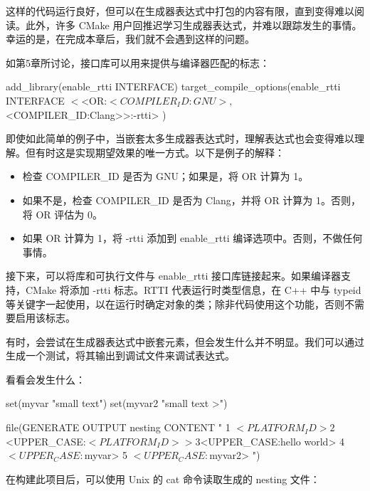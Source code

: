 这样的代码运行良好，但可以在生成器表达式中打包的内容有限，直到变得难以阅读。此外，许多 CMake 用户回推迟学习生成器表达式，并难以跟踪发生的事情。幸运的是，在完成本章后，我们就不会遇到这样的问题。


如第5章所讨论，接口库可以用来提供与编译器匹配的标志：

\begin{cmake}
add_library(enable_rtti INTERFACE)
target_compile_options(enable_rtti INTERFACE
    $<$<OR:$<COMPILER_ID:GNU>,$<COMPILER_ID:Clang>>:-rtti>
)
\end{cmake}

即使如此简单的例子中，当嵌套太多生成器表达式时，理解表达式也会变得难以理解。但有时这是实现期望效果的唯一方式。以下是例子的解释：

\begin{itemize}
\item
检查 COMPILER\_ID 是否为 GNU；如果是，将 OR 计算为 1。

\item
如果不是，检查 COMPILER\_ID 是否为 Clang，并将 OR 计算为 1。否则，将 OR 评估为 0。

\item
如果 OR 计算为 1，将 -rtti 添加到 enable\_rtti 编译选项中。否则，不做任何事情。
\end{itemize}

接下来，可以将库和可执行文件与 enable\_rtti 接口库链接起来。如果编译器支持，CMake 将添加 -rtti 标志。RTTI 代表运行时类型信息，在 C++ 中与 typeid 等关键字一起使用，以在运行时确定对象的类；除非代码使用这个功能，否则不需要启用该标志。


有时，会尝试在生成器表达式中嵌套元素，但会发生什么并不明显。我们可以通过生成一个测试，将其输出到调试文件来调试表达式。

看看会发生什么：


\begin{cmake}
set(myvar "small text")
set(myvar2 "small text >")

file(GENERATE OUTPUT nesting CONTENT "
    1 $<PLATFORM_ID>
    2 $<UPPER_CASE:$<PLATFORM_ID>>
    3 $<UPPER_CASE:hello world>
    4 $<UPPER_CASE:${myvar}>
    5 $<UPPER_CASE:${myvar2}>
")
\end{cmake}

在构建此项目后，可以使用 Unix 的 cat 命令读取生成的 nesting 文件：

